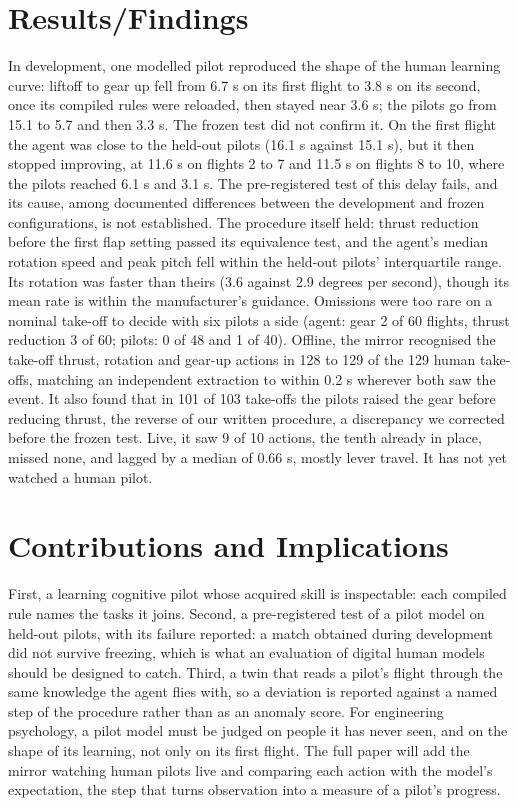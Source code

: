 \documentclass[11pt]{article}
\begin{document}
\section*{Results/Findings}
In development, one modelled pilot reproduced the shape of the human learning curve: liftoff to gear up fell from 6.7 s on its first flight to 3.8 s on its second, once its compiled rules were reloaded, then stayed near 3.6 s; the pilots go from 15.1 to 5.7 and then 3.3 s. The frozen test did not confirm it. On the first flight the agent was close to the held-out pilots (16.1 s against 15.1 s), but it then stopped improving, at 11.6 s on flights 2 to 7 and 11.5 s on flights 8 to 10, where the pilots reached 6.1 s and 3.1 s. The pre-registered test of this delay fails, and its cause, among documented differences between the development and frozen configurations, is not established. The procedure itself held: thrust reduction before the first flap setting passed its equivalence test, and the agent's median rotation speed and peak pitch fell within the held-out pilots' interquartile range. Its rotation was faster than theirs (3.6 against 2.9 degrees per second), though its mean rate is within the manufacturer's guidance. Omissions were too rare on a nominal take-off to decide with six pilots a side (agent: gear 2 of 60 flights, thrust reduction 3 of 60; pilots: 0 of 48 and 1 of 40). Offline, the mirror recognised the take-off thrust, rotation and gear-up actions in 128 to 129 of the 129 human take-offs, matching an independent extraction to within 0.2 s wherever both saw the event. It also found that in 101 of 103 take-offs the pilots raised the gear before reducing thrust, the reverse of our written procedure, a discrepancy we corrected before the frozen test. Live, it saw 9 of 10 actions, the tenth already in place, missed none, and lagged by a median of 0.66 s, mostly lever travel. It has not yet watched a human pilot.

\section*{Contributions and Implications}
First, a learning cognitive pilot whose acquired skill is inspectable: each compiled rule names the tasks it joins. Second, a pre-registered test of a pilot model on held-out pilots, with its failure reported: a match obtained during development did not survive freezing, which is what an evaluation of digital human models should be designed to catch. Third, a twin that reads a pilot's flight through the same knowledge the agent flies with, so a deviation is reported against a named step of the procedure rather than as an anomaly score. For engineering psychology, a pilot model must be judged on people it has never seen, and on the shape of its learning, not only on its first flight. The full paper will add the mirror watching human pilots live and comparing each action with the model's expectation, the step that turns observation into a measure of a pilot's progress.
\end{document}
